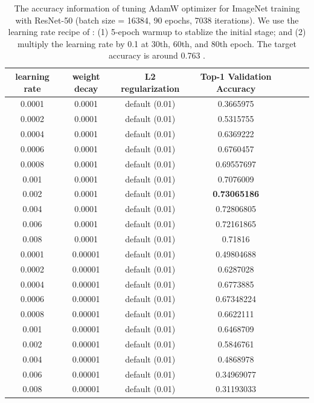 \begin{table}[ht]
\renewcommand{\arraystretch}{1.3}
\caption{The accuracy information of tuning AdamW optimizer for ImageNet training with ResNet-50 (batch size = 16384, 90 epochs, 7038 iterations). We use the learning rate recipe of \citep{goyal2017accurate}: (1) 5-epoch warmup to stablize the initial stage; and (2) multiply the learning rate by 0.1 at 30th, 60th, and 80th epoch. The target accuracy is around 0.763 \citep{goyal2017accurate}.}
\centering
\begin{tabular}{|c|c|c|c|c|c|c|}
\hline
learning rate & weight decay & L2 regularization & Top-1 Validation Accuracy \\
\hline
\hline
0.0001 & 0.0001 & default (0.01) & 0.3665975 \\
\hline
0.0002 & 0.0001 & default (0.01) & 0.5315755 \\
\hline
0.0004 & 0.0001 & default (0.01) & 0.6369222 \\
\hline
0.0006 & 0.0001 & default (0.01) & 0.6760457 \\
\hline
0.0008 & 0.0001 & default (0.01) & 0.69557697 \\
\hline
0.001 & 0.0001 & default (0.01) & 0.7076009 \\
\hline
0.002 & 0.0001 & default (0.01) & {\bf 0.73065186} \\
\hline
0.004 & 0.0001 & default (0.01) & 0.72806805 \\
\hline
0.006 & 0.0001 & default (0.01) & 0.72161865 \\
\hline
0.008 & 0.0001 & default (0.01) & 0.71816 \\
\hline
0.0001 & 0.00001 & default (0.01) & 0.49804688 \\
\hline
0.0002 & 0.00001 & default (0.01) & 0.6287028 \\
\hline
0.0004 & 0.00001 & default (0.01) & 0.6773885 \\
\hline
0.0006 & 0.00001 & default (0.01) & 0.67348224 \\
\hline
0.0008 & 0.00001 & default (0.01) & 0.6622111 \\
\hline
0.001 & 0.00001 & default (0.01) & 0.6468709 \\
\hline
0.002 & 0.00001 & default (0.01) & 0.5846761 \\
\hline
0.004 & 0.00001 & default (0.01) & 0.4868978 \\
\hline
0.006 & 0.00001 & default (0.01) & 0.34969077 \\
\hline
0.008 & 0.00001 & default (0.01) & 0.31193033 \\
\hline
\end{tabular}
\label{table:imagenet_adam_tuning_l2_2}
\end{table}


